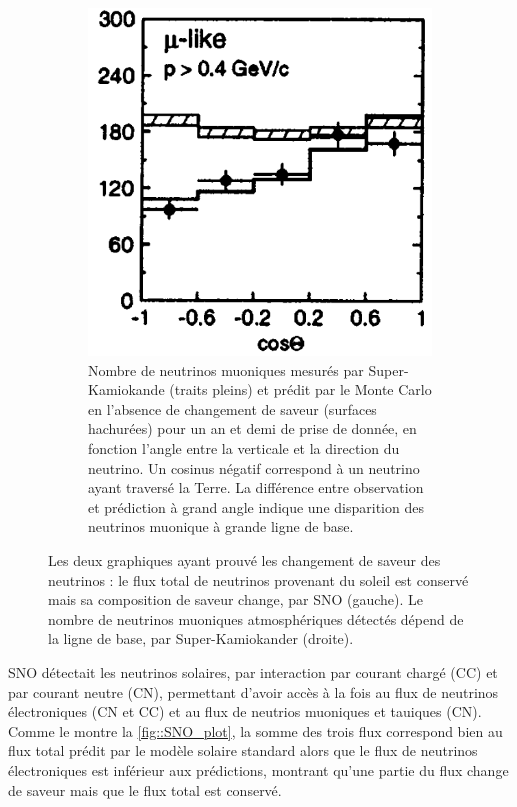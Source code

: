 \begin{figure}[htbp]
                \begin{subfigure}[t]{0.4\textwidth}
                    \includegraphics[width=\textwidth]{Chapitre_1/pictures/superK_plot.png}
                    \caption{Nombre de neutrinos muoniques mesurés par Super-Kamiokande (traits pleins) et prédit par le Monte Carlo en l'absence de changement de saveur (surfaces hachurées) pour un an et demi de prise de donnée, en fonction l'angle entre la verticale et la direction du neutrino\cite{Fukuda1998}. Un cosinus négatif correspond à un neutrino ayant traversé la Terre. La différence entre observation et prédiction à grand angle indique une disparition des neutrinos muonique à grande ligne de base.}
                    \label{fig::superK_plot}
                \end{subfigure}
                \caption[Les preuves que les neutrinos changent de saveur, par SNO et Super-Kamiokande.]{Les deux graphiques ayant prouvé les changement de saveur des neutrinos : le flux total de neutrinos provenant du soleil est conservé mais sa composition de saveur change, par SNO (gauche). Le nombre de neutrinos muoniques atmosphériques détectés dépend de la ligne de base, par Super-Kamiokander (droite).}
            \end{figure}
            
            SNO détectait les neutrinos solaires, par interaction par courant chargé (CC) et par courant neutre (CN), permettant d'avoir accès à la fois au flux de neutrinos électroniques (CN et CC) et au flux de neutrios muoniques et tauiques (CN). Comme le montre la \autoref{fig::SNO_plot}, la somme des trois flux correspond bien au flux total prédit par le modèle solaire standard alors que le flux de neutrinos électroniques est inférieur aux prédictions, montrant qu'une partie du flux change de saveur mais que le flux total est conservé.
            
